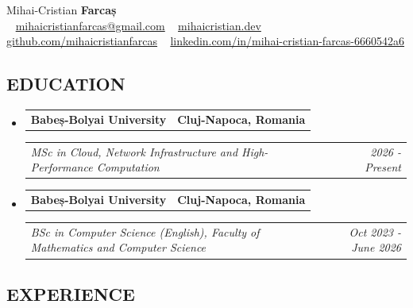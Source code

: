 \documentclass[11pt,a4paper]{article}
\makeatletter
\newcommand{\headerrow}[2]
{
    \begin{tabular*}{\linewidth}{l@{\extracolsep{\fill}}r}
        #1 & #2 \\
    \end{tabular*}
}
\makeatother
\begin{document}
\begin{center}
    {\huge Mihai-Cristian \textbf{Farcaș}} \\ \vspace{0.5em}
    \color{black}
    \  \href{mailto:mihaicristianfarcas@gmail.com}{mihaicristianfarcas@gmail.com}
    \  \href{https://mihaicristian.dev}{mihaicristian.dev}
    \  \href{https://github.com/mihaicristianfarcas}{github.com/mihaicristianfarcas}
    \  \href{https://www.linkedin.com/in/mihai-cristian-farcas-6660542a6/}{linkedin.com/in/mihai-cristian-farcas-6660542a6}
\end{center}

\vspace{-1em}

\subsection*{EDUCATION}
\begin{itemize}[leftmargin=*]
    \item
    \headerrow
        {\textbf{Babeș-Bolyai University}}
        {\textbf{Cluj-Napoca, Romania}}
    \headerrow
        {\emph{MSc in Cloud, Network Infrastructure and High-Performance Computation}}
        {\emph{2026 - Present}}
    \item
    \headerrow
        {\textbf{Babeș-Bolyai University}}
        {\textbf{Cluj-Napoca, Romania}}
    \headerrow
        {\emph{BSc in Computer Science (English), Faculty of Mathematics and Computer Science}}
        {\emph{Oct 2023 - June 2026}}
\end{itemize}

\subsection*{EXPERIENCE}
\end{document}
